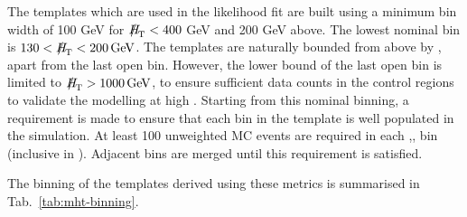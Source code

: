 The \MHT templates which are used in the likelihood fit are built
using a minimum bin width of 100 GeV for $\MHT<400$ GeV and 200 GeV
above. The lowest nominal bin is $130<\MHT<200\,\mathrm{GeV}$. The
\MHT templates are naturally bounded from above by \scalht, apart from
the last open \scalht bin. However, the lower bound of the last open
bin is limited to $\MHT>1000\,\mathrm{GeV}$, to ensure sufficient data
counts in the control regions to validate the modelling at high \mht. 
Starting from this nominal binning, a requirement is made to ensure
that each bin in the template is well populated in the simulation.  At
least 100 unweighted MC events are required in each \njet,\scalht,\MHT
bin (inclusive in \nb). Adjacent \mht bins are merged until this
requirement is satisfied. 

The binning of the \MHT templates derived using these metrics is summarised in Tab.~\ref{tab:mht-binning}.



